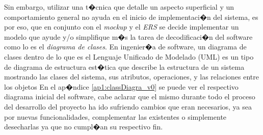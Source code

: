 \par	Sin embargo, utilizar una t�cnica que detalle un aspecto superficial y un comportamiento general no ayuda en el inicio de implementaci�n del sistema, es por eso, que en conjunto con el \textit{mockup} y el \textit{ERS} se decide implementar un modelo que ayude y/o simplifique m�s la tarea de decodificaci�n del software como lo es el \textit{diagrama de clases}. En ingenier�a de software, un diagrama de clases dentro de lo que es el Lenguaje Unificado de Modelado (UML) es un tipo de diagrama de estructura est�tica que describe la estructura de un sistema mostrando las clases del sistema, sus atributos, operaciones, y las relaciones entre los objetos %
En el ap�ndice \ref{ap1:classDiagra_v0} se puede ver el respectivo diagrama inicial del software, cabe aclarar que el mismo durante todo el proceso del desarrollo del proyecto ha ido sufriendo cambios que eran necesarios, ya sea por nuevas funcionalidades, complementar las existentes  o simplemente desecharlas ya que no cumpl�an su respectivo fin. 


